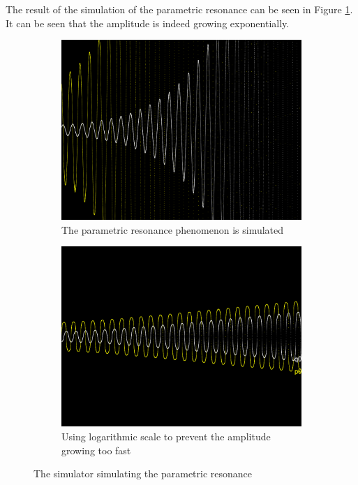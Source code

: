 \documentclass[12pt]{article}
\begin{document}
The result of the simulation of the parametric resonance can be seen in Figure \ref{fig:parametric}.
It can be seen that the amplitude is indeed growing exponentially.

\begin{figure}[h]
  \centering
  \begin{subfigure}[b]{0.45\linewidth}
    \includegraphics[width=\linewidth]{parametric_resonance.png}
    \caption{The parametric resonance phenomenon is simulated}
  \end{subfigure}
  \begin{subfigure}[b]{0.45\linewidth}
    \includegraphics[width=\linewidth]{parametric_resonance_logarithmic.png}
    \caption{Using logarithmic scale to prevent the amplitude growing too fast}
  \end{subfigure}
  \caption{The simulator simulating the parametric resonance}
  \label{fig:parametric}
\end{figure}
\end{document}
